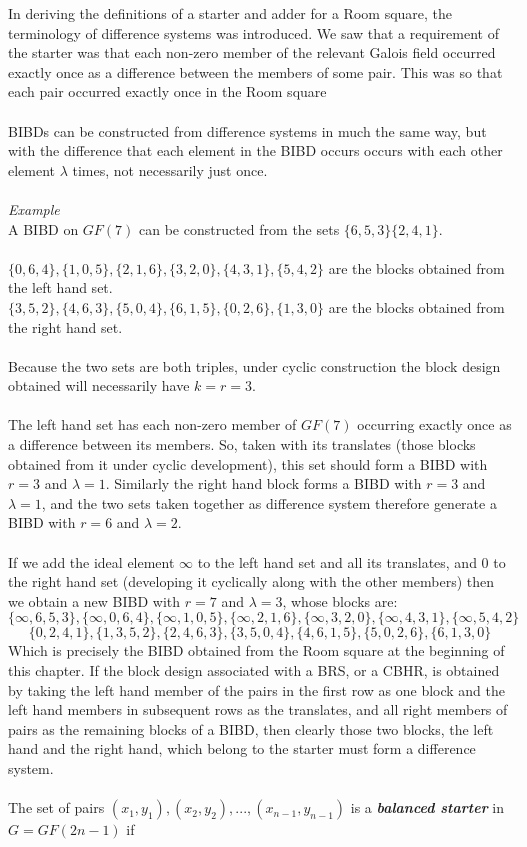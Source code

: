 \documentclass[
  12pt,
  a4paper]{book}
\begin{document}
In deriving the definitions of a starter and adder for a Room square,
the terminology of difference systems was introduced. We saw that a
requirement of the starter was that each non-zero member of the relevant
Galois field occurred exactly once as a difference between the members
of some pair. This was so that each pair occurred exactly once in the
Room square\\
~\\
BIBDs can be constructed from difference systems in much the same way,
but with the difference that each element in the BIBD occurs occurs with
each other element \(\lambda\) times, not necessarily just once.\\
~\\
\emph{Example}\\
A BIBD on \(GF(7)\) can be constructed from the sets
\(\{6,5,3\}\{2,4,1\}\).\\
~\\
\(\{0,6,4\},\{1,0,5\},\{2,1,6\},\{3,2,0\},\{4,3,1\},\{5,4,2\}\) are the
blocks obtained from the left hand set.\\
\(\{3,5,2\},\{4,6,3\},\{5,0,4\},\{6,1,5\},\{0,2,6\},\{1,3,0\}\) are the
blocks obtained from the right hand set.\\
~\\
Because the two sets are both triples, under cyclic construction the
block design obtained will necessarily have \(k=r=3\).\\
~\\
The left hand set has each non-zero member of \(GF(7)\) occurring exactly
once as a difference between its members. So, taken with its translates
(those blocks obtained from it under cyclic development), this set
should form a BIBD with \(r=3\) and \(\lambda=1\). Similarly the right hand
block forms a BIBD with \(r=3\) and \(\lambda=1\), and the two sets taken
together as difference system therefore generate a BIBD with \(r=6\) and
\(\lambda =2\).\\
~\\
If we add the ideal element \(\infty\) to the left hand set and all its
translates, and 0 to the right hand set (developing it cyclically along
with the other members) then we obtain a new BIBD with \(r=7\) and
\(\lambda = 3\), whose blocks are:
\[\{\infty,6,5,3\},\{\infty,0,6,4\},\{\infty,1,0,5\},\{\infty,2,1,6\},\{\infty,3,2,0\},\{\infty,4,3,1\},\{\infty,5,4,2\}\]
\[\{0,2,4,1\},\{1,3,5,2\},\{2,4,6,3\},\{3,5,0,4\},\{4,6,1,5\},\{5,0,2,6\},\{6,1,3,0\}\]
Which is precisely the BIBD obtained from the Room square at the
beginning of this chapter. If the block design associated with a BRS, or
a CBHR, is obtained by taking the left hand member of the pairs in the
first row as one block and the left hand members in subsequent rows as
the translates, and all right members of pairs as the remaining blocks
of a BIBD, then clearly those two blocks, the left hand and the right
hand, which belong to the starter must form a difference system.\\
~\\
The set of pairs \((x_1,y_1),(x_2,y_2),...,(x_{n-1},y_{n-1})\) is a
\textbf{\emph{balanced starter}} in \(G=GF(2n-1)\) if
\end{document}
